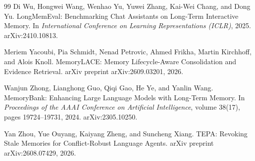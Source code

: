 \documentclass[11pt]{article}
\begin{document}
\begin{thebibliography}{99}
Di Wu, Hongwei Wang, Wenhao Yu, Yuwei Zhang, Kai-Wei Chang, and Dong Yu.
LongMemEval: Benchmarking Chat Assistants on Long-Term Interactive Memory.
In \emph{International Conference on Learning Representations (ICLR)}, 2025.
arXiv:2410.10813.

Meriem Yacoubi, Pia Schmidt, Nenad Petrovic, Ahmed Frikha, Martin Kirchhoff, and Alois Knoll.
MemoryLACE: Memory Lifecycle-Aware Consolidation and Evidence Retrieval.
arXiv preprint arXiv:2609.03201, 2026.

Wanjun Zhong, Lianghong Guo, Qiqi Gao, He Ye, and Yanlin Wang.
MemoryBank: Enhancing Large Language Models with Long-Term Memory.
In \emph{Proceedings of the AAAI Conference on Artificial Intelligence}, volume 38(17), pages 19724--19731, 2024.
arXiv:2305.10250.

Yan Zhou, Yue Ouyang, Kaiyang Zheng, and Suncheng Xiang.
TEPA: Revoking Stale Memories for Conflict-Robust Language Agents.
arXiv preprint arXiv:2608.07429, 2026.

\end{thebibliography}
\end{document}
